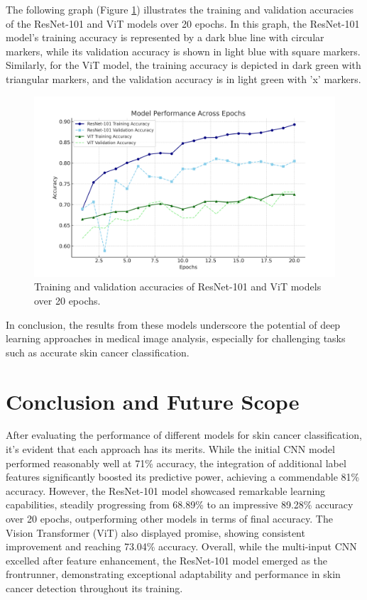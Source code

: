 \documentclass[conference]{IEEEtran}
\begin{document}
The following graph (Figure \ref{fig:model-accuracies}) illustrates the training and validation accuracies of the ResNet-101 and ViT models over 20 epochs. In this graph, the ResNet-101 model's training accuracy is represented by a dark blue line with circular markers, while its validation accuracy is shown in light blue with square markers. Similarly, for the ViT model, the training accuracy is depicted in dark green with triangular markers, and the validation accuracy is in light green with 'x' markers.

\begin{figure}[h]
    \centering
    \includegraphics[width=1.05\linewidth]{fig4.png}
    \caption{Training and validation accuracies of ResNet-101 and ViT models over 20 epochs.}
    \label{fig:model-accuracies}
\end{figure}


In conclusion, the results from these models underscore the potential of deep learning approaches in medical image analysis, especially for challenging tasks such as accurate skin cancer classification.


\section{Conclusion and Future Scope}
After evaluating the performance of different models for skin cancer classification, it's evident that each approach has its merits. While the initial CNN model performed reasonably well at 71\% accuracy, the integration of additional label features significantly boosted its predictive power, achieving a commendable 81\% accuracy. However, the ResNet-101 model showcased remarkable learning capabilities, steadily progressing from 68.89\% to an impressive 89.28\% accuracy over 20 epochs, outperforming other models in terms of final accuracy. The Vision Transformer (ViT) also displayed promise, showing consistent improvement and reaching 73.04\% accuracy. Overall, while the multi-input CNN excelled after feature enhancement, the ResNet-101 model emerged as the frontrunner, demonstrating exceptional adaptability and performance in skin cancer detection throughout its training.
\end{document}
